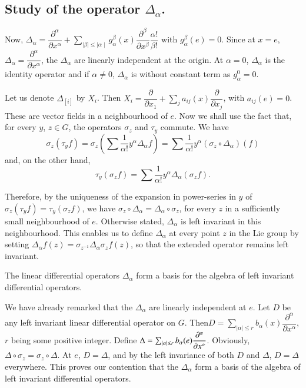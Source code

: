 \subsection{Study of the operator
  $\Delta_\alpha$.}\label{chap2-sec2.5}%

Now, $\Delta_\alpha = \dfrac {\partial^\alpha}{\partial x^\alpha} +
\sum\limits_{\mid \beta \mid \le \mid \alpha \mid} g^\beta_\alpha (x)
\dfrac {\partial^\beta}{\partial x^\beta} \dfrac {\alpha !}{\beta !}$
with $g^\beta_\alpha (e)=0$.  
Since at $x = e$, $\Delta_\alpha = \dfrac{\partial^\alpha}{\partial
  x^\alpha}$, the $\Delta_\alpha$ are linearly independent at the
origin. At $\alpha = 0$, $\Delta_\alpha$ is the identity operator and
if $\alpha \neq 0$, $\Delta_\alpha$ is without constant term as
$g^0_\alpha=0$. 

Let us denote $\Delta_{[i]}$ by $X_i$. Then $X_i =
\dfrac{\partial}{\partial x_1}+\sum_{j}
a_{ij}(x)\dfrac{\partial}{\partial x_j}$, with $a_{ij}(e)=0$. These
are vector fields in a neighbourhood of $e$. Now we shall use the fact
that, for every $y$, $z \in G$, the operators $\sigma_z$ and $\tau_y$
commute. We have 
$$
\sigma_z(\tau_y f)= \sigma_z (\sum \dfrac{1}{\alpha !} y^\alpha
\Delta_\alpha f) = \sum \dfrac{1}{\alpha !} y^\alpha (\sigma _z \circ
\Delta_\alpha)(f) 
$$
and, on the other hand, 
$$
\tau_y (\sigma_z f) = \sum \dfrac{1}{\alpha !} y^\alpha \Delta_\alpha
(\sigma_z f). 
$$

Therefore, by the uniqueness of the expansion in power-series in $y$
of $\sigma_z(\tau_y f)= \tau_y (\sigma_z f)$, we have $\sigma_z \circ
\Delta_\alpha = \Delta_\alpha \circ \sigma_z$, for every $z$ in a
sufficiently small neighbourhood of $e$. Otherwise stated,
$\Delta_\alpha$ is left invariant in this neighbourhood. This enables
us to define $\Delta_\alpha$ at every point $z$ in the Lie group by
setting $\Delta_\alpha f(z) = \sigma_{z^{-1}} \Delta_\alpha \sigma_z
f(z)$, so that the extended operator remains left invariant. 

\setcounter{thm}{0}
\begin {thm}\label{chap2-thm1}%
The linear differential operators $\Delta_\alpha$ form a basis for the
algebra of left invariant differential operators. 
\end{thm}

We have already remarked that the $\Delta_\alpha$ are linearly
independent at $e$. Let $D$ be any left invariant linear differential
operator on $G$. 
Then\pageoriginale $D=\sum_{| \alpha| \leq r} b_\alpha (x)
\dfrac{\partial^\alpha}{\partial x^\alpha}$, $r$ being some positive
integer. Define $\Delta=\sum_{| \alpha| \leq r}  b_\alpha
(e)\break\dfrac{\partial^\alpha}{\partial x^\alpha}$. Obviously, $\Delta\circ
\sigma_z=\sigma_z \circ \Delta$. At $e$, $D=\Delta$,  and by the left
invariance of both $D$ and $\Delta$, $D=\Delta$ everywhere. This proves
our contention that the $\Delta_\alpha$ form a basis of the algebra of
left invariant differential operators. 

